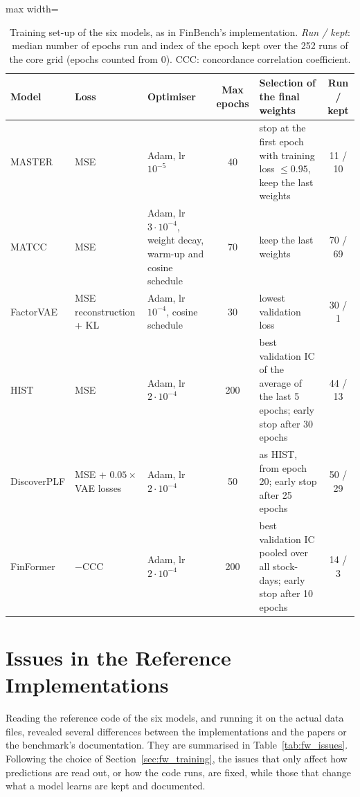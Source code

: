\begin{table}[htbp]
    \centering
    \footnotesize
    \begin{adjustbox}{max width=\textwidth}
    \begin{tabular}{@{}lp{2.4cm}p{3.2cm}cp{5.2cm}c@{}}
        \toprule
        \textbf{Model} & \textbf{Loss} & \textbf{Optimiser} & \textbf{Max epochs} & \textbf{Selection of the final weights} & \textbf{Run / kept} \\
        \midrule
        MASTER & MSE & Adam, lr $10^{-5}$ & 40 & stop at the first epoch with training loss $\leq 0.95$, keep the last weights & 11 / 10 \\
        MATCC & MSE & Adam, lr $3 \cdot 10^{-4}$, weight decay, warm-up and cosine schedule & 70 & keep the last weights & 70 / 69 \\
        FactorVAE & MSE reconstruction + KL & Adam, lr $10^{-4}$, cosine schedule & 30 & lowest validation loss & 30 / 1 \\
        HIST & MSE & Adam, lr $2 \cdot 10^{-4}$ & 200 & best validation IC of the average of the last 5 epochs; early stop after 30 epochs & 44 / 13 \\
        DiscoverPLF & MSE + $0.05 \times$ VAE losses & Adam, lr $2 \cdot 10^{-4}$ & 50 & as HIST, from epoch 20; early stop after 25 epochs & 50 / 29 \\
        FinFormer & $-$CCC & Adam, lr $2 \cdot 10^{-4}$ & 200 & best validation IC pooled over all stock-days; early stop after 10 epochs & 14 / 3 \\
        \bottomrule
    \end{tabular}
    \end{adjustbox}
    \caption{Training set-up of the six models, as in FinBench's implementation. \emph{Run / kept}: median number of epochs run and index of the epoch kept over the 252 runs of the core grid (epochs counted from 0). CCC: concordance correlation coefficient.}
    \label{tab:fw_training}
\end{table}

\section{Issues in the Reference Implementations}
\label{sec:fw_issues}

Reading the reference code of the six models, and running it on the actual data files, revealed several differences between the implementations and the papers or the benchmark's documentation. They are summarised in Table~\ref{tab:fw_issues}. Following the choice of Section~\ref{sec:fw_training}, the issues that only affect how predictions are read out, or how the code runs, are fixed, while those that change what a model learns are kept and documented.


